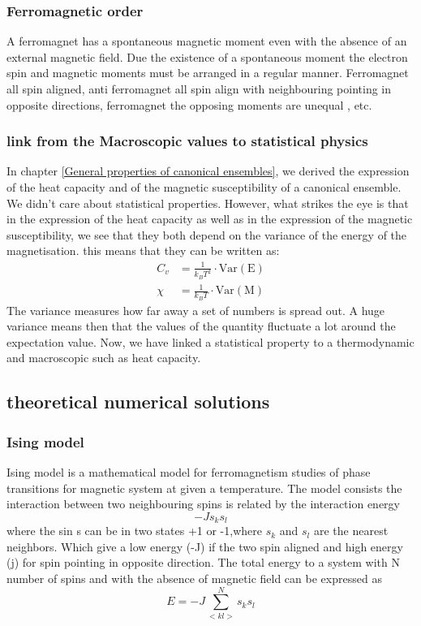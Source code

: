 \documentclass[10pt,a4paper]{article}
\begin{document}
\subsubsection{Ferromagnetic order}
A ferromagnet has a spontaneous magnetic moment even with the absence of an external magnetic field. Due the existence of a spontaneous moment the electron spin and magnetic moments must be arranged in a regular manner.
Ferromagnet all spin aligned, anti ferromagnet all spin align with neighbouring pointing in opposite directions, ferromagnet the opposing moments are unequal , etc.

\subsubsection{link from the Macroscopic values to statistical physics}
In chapter \ref{General properties of canonical ensembles}, we derived the expression of the heat capacity and of the magnetic susceptibility of a canonical ensemble. We didn't care about statistical properties. However, what strikes the eye is that in the expression of the heat capacity as well as in the expression of the magnetic susceptibility, we see that they both depend on the variance of the energy of the magnetisation. this means that they can be written as:
\begin{align}
C_v &= \frac{1}{k_B T^2}\cdot \mathrm{Var(E)}\\
\chi &= \frac{1}{k_B T} \cdot \mathrm{Var(M)}
\end{align}
The variance measures how far away a set of numbers is spread out. A huge variance means then that the values of the quantity fluctuate a lot around the expectation value.  Now, we have linked a statistical property to a thermodynamic and macroscopic such as heat capacity. 
\subsection{theoretical numerical solutions}

\subsubsection{Ising model}
Ising model is a mathematical model for ferromagnetism studies of phase transitions for magnetic system at given a temperature. The model consists the interaction between two neighbouring spins is related by the interaction energy 
\begin{equation}
  -Js_ks_l
\end{equation} 
where the sin s can be in two states +1 or -1,where  $s_k$ and $s_l$ are the nearest neighbors. Which give a low energy (-J) if the two spin aligned and high energy (j) for spin pointing in opposite direction. The total energy to a system with N number of spins and with the absence of magnetic field can be expressed as 
\begin{equation}
  E=-J\sum_{<kl>}^{N}s_ks_l
\end{equation}
\end{document}
